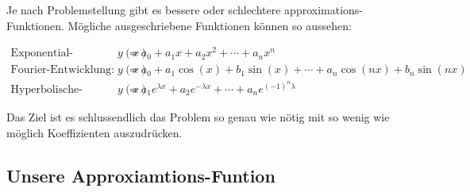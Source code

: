 Je nach Problemstellung gibt es bessere oder schlechtere approximations-Funktionen. Mögliche ausgeschriebene Funktionen können so aussehen:

\begin{equation}
	\begin{aligned}
		\text{Exponential-Entwicklung: }
		y(x)&=
		a_0+a_1 x+a_2 x^2+\cdots+a_n x^n \\
		\text{Fourier-Entwicklung: } 
		y(x)&=
		a_0+a_1\cos(x)+b_1\sin(x)+\cdots+a_n\cos(n x)+b_n\sin(n x)\\
		\text{Hyperbolische-Entwicklung: } 
		y(x)&=
		a_1 e^{\lambda x}+a_2 e^{-\lambda x}+\cdots+a_n e^{(-1)^n \lambda}
	\end{aligned}
\end{equation}

Das Ziel ist es schlussendlich das Problem so genau wie nötig mit so wenig wie möglich Koeffizienten auszudrücken.


\subsection{Unsere Approxiamtions-Funtion}







